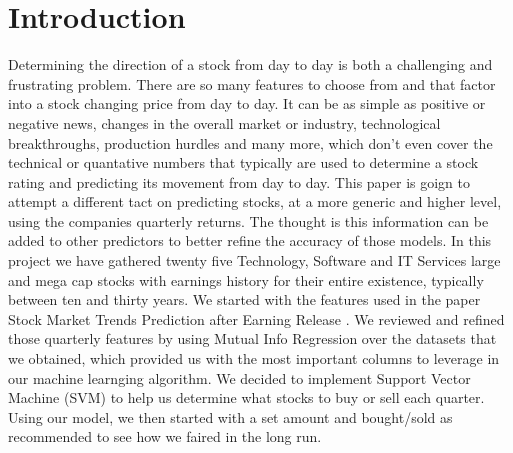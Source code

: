 \documentclass[conference]{IEEEtran}
\begin{document}

\section{Introduction}
Determining the direction of a stock from day to day is both a challenging and frustrating problem.  There are so many features to choose from and that factor into a stock changing price from day to day. It can be as simple as positive or negative news, changes in the overall market or industry, technological breakthroughs, production hurdles and many more, which don't even cover the technical or quantative numbers that typically are used to determine a stock rating and predicting its movement from day to day.  This paper is goign to attempt a different tact on predicting stocks, at a more generic and higher level, using the companies quarterly returns.  The thought is this information can be added to other predictors to better refine the accuracy of those models.  In this project we have gathered twenty five Technology, Software and IT Services large and mega cap stocks with earnings history for their entire existence, typically between ten and thirty years.  We started with the features used in the paper Stock Market Trends Prediction after Earning Release  \cite{QuarterlyPrediction}.  We reviewed and refined those quarterly features by using Mutual Info Regression over the datasets that we obtained, which provided us with the most important columns to leverage in our machine learnging algorithm.  We decided to implement Support Vector Machine (SVM) to help us determine what stocks to buy or sell each quarter.  Using our model, we then started with a set amount and bought/sold as recommended to see how we faired in the long run.
\end{document}
